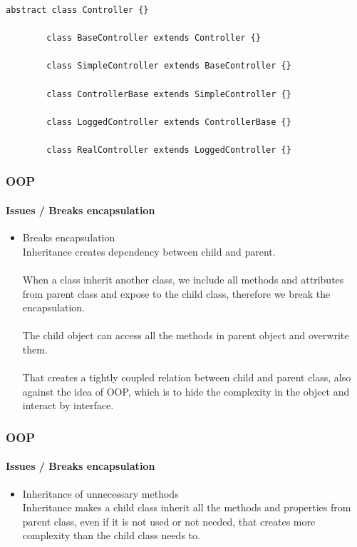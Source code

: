 \begin{frame}[fragile,c]
\begin{minipage}{.80\textwidth}
\begin{lstlisting}[numbers=none]
        abstract class Controller {}

        class BaseController extends Controller {}

        class SimpleController extends BaseController {}

        class ControllerBase extends SimpleController {}

        class LoggedController extends ControllerBase {}

        class RealController extends LoggedController {}
        \end{lstlisting}
    \end{minipage}
\end{frame}

\begin{frame}
    \frametitle{OOP}
    \framesubtitle{Issues / Breaks encapsulation}

    \begin{itemize}
        \item Breaks encapsulation\pause
              \textcolor{ecgrey!50}{
              \\Inheritance creates dependency between child and parent.\\~\\\pause
              When a class inherit another class, we include all methods and attributes from parent
              class and expose to the child class, therefore we break the encapsulation.\\~\\\pause
              The child object can access all the methods in parent object and overwrite them.\\~\\\pause
              That creates a tightly coupled relation between child and parent class,
              also against the idea of OOP, which is to hide the complexity in the
              object and interact by interface.}
    \end{itemize}
\end{frame}

\begin{frame}
    \frametitle{OOP}
    \framesubtitle{Issues / Breaks encapsulation}

    \begin{itemize}
        \item Inheritance of unnecessary methods\pause
              \textcolor{ecgrey!50}{
              \\Inheritance makes a child class inherit all the methods
              and properties from parent class, even if it is not used or not needed,
              that creates more complexity than the child class needs to.}
    \end{itemize}
\end{frame}

